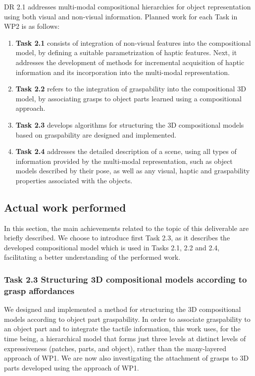 \documentclass[a4paper,11pt,pdf]{pacmanreport}
\begin{document}
DR 2.1 addresses multi-modal compositional hierarchies for object representation using both visual and non-visual information. Planned work for each Task in WP2 is as follows:
\begin{enumerate}

\item[] \textbf{Task 2.1} consists of integration of non-visual features into the compositional model, by defining a suitable parametrization of haptic features. Next, it addresses the development of methods for incremental acquisition of haptic information and its incorporation 
into the multi-modal representation. 

\item[] \textbf{Task 2.2} refers to the integration of graspability into the compositional 3D model, by associating grasps to object parts learned using a compositional approach.

\item[] \textbf{Task 2.3} develops algorithms for structuring the 3D 
compositional models based on graspability are designed and implemented.

\item[] \textbf{Task 2.4} addresses the detailed description of a scene, using all types of information provided by the multi-modal representation, such as object models described by their pose, as well as any visual, haptic and graspability properties associated with the objects.

\end{enumerate}

\subsection{Actual work performed}

In this section, the main achievements related to the topic of this deliverable are briefly described. We choose to introduce first Task 2.3, as it describes the developed compositional model which is used in Tasks 2.1, 2.2 and 2.4, facilitating a better understanding of the performed work.


\subsubsection{Task 2.3 Structuring 3D compositional models according to grasp affordances}

We designed and implemented a method for structuring the 3D compositional models according to object part graspability. In order to associate graspability to an object part and to integrate the tactile information, this work uses, for the time being, a hierarchical model 
that forms just three levels at distinct levels of expressiveness (patches, parts, and object), rather than the many-layered approach of WP1. We are now also investigating the attachment of grasps to 3D parts developed using the approach of WP1.
\end{document}

